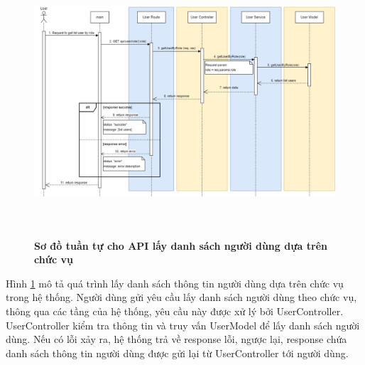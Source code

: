 \begin{figure}[H]
  \centering
  \includegraphics[width=16cm,height=10cm]{Images/sequence_api/getUserByRole.png}
  \caption[Sơ đồ tuần tự cho API lấy danh sách người dùng dựa trên chức vụ ]{\bfseries \fontsize{12pt}{0pt}
  \selectfont Sơ đồ tuần tự cho API lấy danh sách người dùng dựa trên chức vụ }
  \label{api_getUserByRole} %
\end{figure}
Hình \ref{api_getUserByRole} mô tả quá trình lấy danh sách thông tin người dùng dựa trên chức vụ trong hệ thống. Người dùng gửi yêu cầu lấy danh sách người dùng theo chức vụ, thông qua các tầng của hệ thống, yêu cầu này được xử lý bởi UserController. UserController kiểm tra thông tin và truy vấn UserModel để lấy danh sách người dùng. 
Nếu có lỗi xảy ra, hệ thống trả về response lỗi, ngược lại, response chứa danh sách thông tin người dùng được gửi lại từ UserController tới người dùng.

